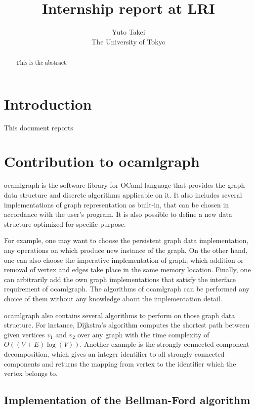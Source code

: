 \documentclass[a4paper,12pt]{article}
\title{Internship report at LRI}
\author{Yuto Takei \\ The University of Tokyo }
\begin{document}
\maketitle

\begin{abstract}
  This is the abstract.
\end{abstract}

\section{Introduction}

This document reports 

\section{Contribution to ocamlgraph}

ocamlgraph \cite{conchon07tfp} is the software library for OCaml
language that provides the graph data structure and discrete
algorithms applicable on it. It also includes several implementations
of graph representation as built-in, that can be chosen in accordance
with the user's program. It is also possible to define a new data
structure optimized for specific purpose.

For example, one may want to choose the persistent graph data
implementation, any operations on which produce new instance of the
graph. On the other hand, one can also choose the imperative
implementation of graph, which addition or removal of vertex and edges
take place in the same memory location. Finally, one can arbitrarily
add the own graph implementations that satisfy the interface
requirement of ocamlgraph. The algorithms of ocamlgraph can be
performed any choice of them without any knowledge about the
implementation detail.

ocamlgraph also contains several algorithms to perform on those graph
data structure. For instance, Dijkstra's algorithm computes the
shortest path between given vertices $v_1$ and $v_2$ over any graph
with the time complexity of $O((V+E)\log(V))$. Another example is the
strongly connected component decomposition, which gives an integer
identifier to all strongly connected components and returns the
mapping from vertex to the identifier which the vertex belongs to.

\subsection {Implementation of the Bellman-Ford algorithm}
\end{document}
